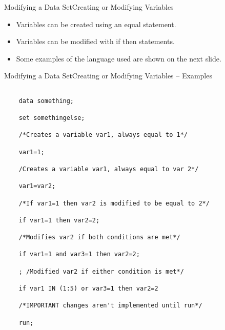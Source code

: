 \documentclass{beamer}
\begin{document}
\begin{frame}[fragile]{Modifying a Data Set}{Creating or Modifying Variables}

\begin{itemize}

    \item Variables can be created using an equal statement.

    \item Variables can be modified with if then statements.

    \item Some examples of the language used are shown on the next slide.

    \end{itemize}

    \end{frame}

    

    \begin{frame}[fragile]{Modifying a Data Set}{Creating or Modifying Variables -- Examples}

    \begin{verbatim}

    data something;

    set somethingelse;

    /*Creates a variable var1, always equal to 1*/

    var1=1; 

    /Creates a variable var1, always equal to var 2*/

    var1=var2; 

    /*If var1=1 then var2 is modified to be equal to 2*/

    if var1=1 then var2=2; 

    /*Modifies var2 if both conditions are met*/

    if var1=1 and var3=1 then var2=2; 

    ; /Modified var2 if either condition is met*/

    if var1 IN (1:5) or var3=1 then var2=2

    /*IMPORTANT changes aren't implemented until run*/

    run; 

    \end{verbatim}

\end{frame}
\end{document}
